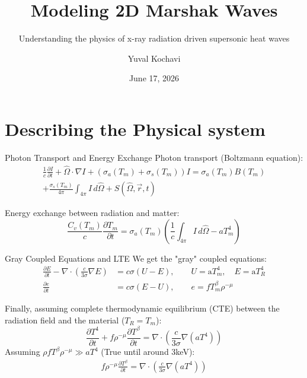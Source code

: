 \documentclass{beamer}
\title[Modeling 2D Marshak Waves]{Modeling 2D Marshak Waves}
\subtitle{Understanding the physics of x-ray radiation driven supersonic heat waves}
\author[Yuval Kochavi]{Yuval Kochavi}
\institute[HUJI]{The Hebrew University of Jerusalem}
\date{June 17, 2026}
\begin{document}
\begin{frame}
    \titlepage
\end{frame}

\section{Describing the Physical system}

\begin{frame}{Photon Transport and Energy Exchange}
    Photon transport (Boltzmann equation):
    \begin{multline}
        \frac{1}{c} \frac{\partial I}{\partial t} + \hat{\Omega} \cdot \nabla I + (\sigma_a(T_m) + \sigma_s(T_m))I = \sigma_a(T_m)B(T_m) \\
        + \frac{\sigma_s(T_m)}{4\pi} \int_{4\pi} I \, d\hat{\Omega} + S(\hat{\Omega}, \vec{r}, t)
    \end{multline}
    
    \vspace{0.5cm}
    Energy exchange between radiation and matter:
    \begin{equation}
        \frac{C_v(T_m)}{c} \frac{\partial T_m}{\partial t} = \sigma_a(T_m) \left( \frac{1}{c} \int_{4\pi} I \, d\hat{\Omega} - aT_m^4 \right)
    \end{equation}
\end{frame}

\begin{frame}{Gray Coupled Equations and LTE}
    We get the "gray" coupled equations:
    \begin{align*}
        \frac{\partial E}{\partial t} - \nabla \cdot \left(\frac{c}{3\sigma} \nabla E\right) &= c\sigma(U - E), \quad \quad U = \mathrm{a} T_m^4, \quad E = \mathrm{a} T_R^4 \\
        \frac{\partial e}{\partial t} &= c\sigma(E - U), \quad \quad e = f T_m^\beta \rho^{-\mu}
    \end{align*}

    Finally, assuming complete thermodynamic equilibrium (CTE) between the radiation field and the material ($T_R = T_m$):
    \begin{equation}
        \frac{\partial T^4}{\partial t} + f \rho^{-\mu}\frac{\partial T^{\beta}}{\partial t} = \nabla \cdot \left(\frac{c}{3\sigma} \nabla (aT^4)\right)
    \end{equation}
    Assuming $\rho f T^\beta \rho^{-\mu} \gg aT^4$ (True until around 3keV):
    \begin{align*}
        f \rho^{-\mu}\frac{\partial T^{\beta}}{\partial t} = \nabla \cdot \left(\frac{c}{3\sigma} \nabla (aT^4)\right)
    \end{align*}
\end{frame}
\end{document}
